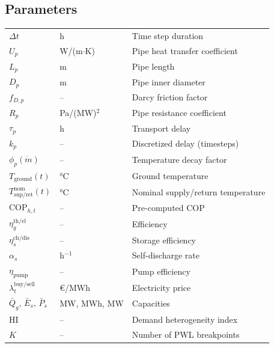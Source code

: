 \documentclass[review,3p]{elsarticle}
\begin{document}
\subsection*{Parameters}
\begin{tabular}{@{}p{2.8cm}p{2.0cm}p{7.5cm}@{}}
$\Delta t$                  & h             & Time step duration \\
$U_p$                       & W/(m$\cdot$K) & Pipe heat transfer coefficient \\
$L_p$                       & m             & Pipe length \\
$D_p$                       & m             & Pipe inner diameter \\
$f_{D,p}$                   & --            & Darcy friction factor \\
$R_p$                       & Pa/(MW)$^2$   & Pipe resistance coefficient \\
$\tau_p$                    & h             & Transport delay \\
$k_p$                       & --            & Discretized delay (timesteps) \\
$\phi_p(\dot{m})$           & --            & Temperature decay factor \\
$T_{\mathrm{ground}}(t)$   & \si{\celsius} & Ground temperature \\
$T_{\mathrm{sup/ret}}^{\mathrm{nom}}(t)$ & \si{\celsius}
  & Nominal supply/return temperature \\
$\mathrm{COP}_{h,t}$       & --            & Pre-computed COP \\
$\eta_g^{\mathrm{th/el}}$  & --            & Efficiency \\
$\eta_{s}^{\mathrm{ch/dis}}$ & --          & Storage efficiency \\
$\alpha_s$                  & h$^{-1}$      & Self-discharge rate \\
$\eta_{\mathrm{pump}}$     & --            & Pump efficiency \\
$\lambda_t^{\mathrm{buy/sell}}$ & \euro/MWh & Electricity price \\
$\bar{Q}_g,\, \bar{E}_s,\, \bar{P}_s$ & MW, MWh, MW & Capacities \\
$\mathrm{HI}$               & --            & Demand heterogeneity index \\
$K$                          & --            & Number of PWL breakpoints \\
\end{tabular}
\end{document}
